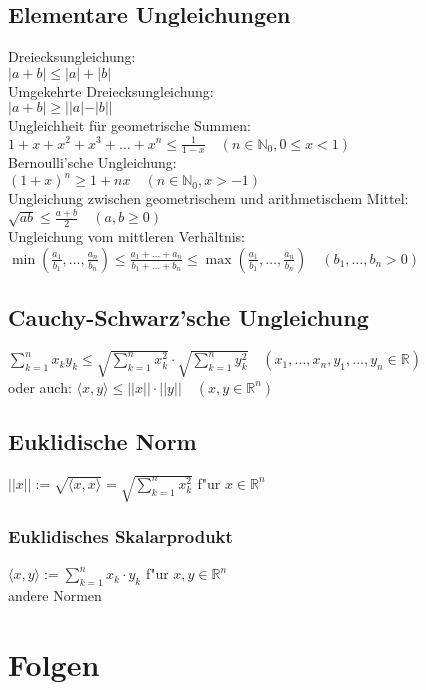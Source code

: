 \documentclass[10pt,a4paper^, twocolumn]{article}
\newcommand{\menge}{\mathbb} %
\begin{document}
\subsection{Elementare Ungleichungen}
Dreiecksungleichung: \\
$|a+b| \leq |a|+|b|$ \\
Umgekehrte Dreiecksungleichung: \\
$|a+b| \geq ||a|-|b||$ \\
Ungleichheit für geometrische Summen:\\
$1+x+x^2+x^3+\dots+x^n \leq \frac{1}{1-x} \quad (n \in \menge{N}_0, 0 \leq x < 1)$ \\
Bernoulli'sche Ungleichung:\\
$(1+x)^n \geq 1+nx \quad (n \in \menge{N}_0, x > -1)$ \\
Ungleichung zwischen geometrischem und arithmetischem Mittel: \\
$\sqrt{ab} \leq \frac{a+b}{2} \quad (a,b \geq 0)$ \\
Ungleichung vom mittleren Verhältnis:\\
	$
	\min(\frac{a_1}{b_1}, \dots, \frac{a_n}{b_n}) 
	\leq \frac{a_1+\dots+a_n}{b_1+\dots+b_n} 
	\leq \max(\frac{a_1}{b_1}, \dots, \frac{a_n}{b_n})
	\quad (b_1,\dots,b_n > 0)
	$
\subsection{Cauchy-Schwarz'sche Ungleichung}
$\sum\limits_{k=1}^n x_ky_k \leq \sqrt{\sum\limits_{k=1}^n x_k^2} \cdot \sqrt{\sum\limits_{k=1}^n y_k^2} \quad (x_1,\dots,x_n,y_1,\dots,y_n \in \menge{R})$ \\
oder auch: $\langle x,y \rangle \leq ||x|| \cdot ||y|| \quad (x,y \in \menge{R}^n)$
\subsection{Euklidische Norm}
$||x|| := \sqrt{\langle x,x \rangle} = \sqrt{\sum\limits_{k=1}^n x_k^2}$ \quad f"ur $x \in \menge{R}^n$
\subsubsection{Euklidisches Skalarprodukt}
$\langle x,y \rangle := \sum\limits_{k=1}^n x_k \cdot y_k$ \quad f"ur $x,y \in \menge{R}^n$ \\
andere Normen

\section{Folgen}
\end{document}
